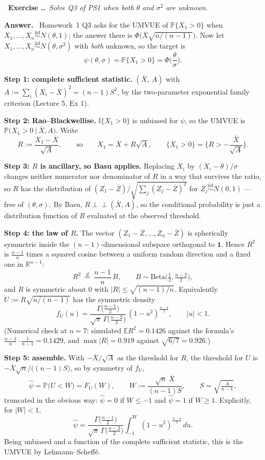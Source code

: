 \documentclass[11pt]{article}
\newcommand{\E}{\mathbb{E}}
\newcommand{\Prob}{\mathbb{P}}
\newcommand{\R}{\mathbb{R}}
\newcommand{\Xbar}{\overline{X}}
\newcommand{\Zbar}{\overline{Z}}
\newcommand{\iid}{\overset{\text{iid}}{\sim}}
\newcommand{\ind}{\perp\!\!\!\perp}
\newcommand{\I}{\mathbb{I}}
\newcounter{exc}[section]
\newenvironment{exc}[1]{\medskip\refstepcounter{exc}%
  \noindent\textbf{\color{ForestGreen}\raisebox{0.5pt}{\scriptsize$\blacksquare$}\ Exercise \thesection.\theexc.}\ \textit{#1}\par\nopagebreak}{\par}
\newcommand{\ans}{\smallskip\noindent\textbf{Answer.}\ }
\begin{document}
\begin{exc}{Solve Q3 of PS1 when both $\theta$ and $\sigma^2$ are unknown.}
\end{exc}
\ans
Homework~1 Q3 asks for the UMVUE of $\Prob\{X_1>0\}$ when $X_1,\dots,X_n\iid N(\theta,1)$;
the answer there is $\Phi\big(\Xbar\sqrt{n/(n-1)}\big)$. Now let
$X_1,\dots,X_n\iid N(\theta,\sigma^2)$ with \emph{both} unknown, so the target is
\[
\psi(\theta,\sigma)=\Prob\{X_1>0\}=\Phi\!\Big(\frac{\theta}{\sigma}\Big).
\]

\textbf{Step 1: complete sufficient statistic.} $(\Xbar,\ A)$ with
$A:=\sum_i(X_i-\Xbar)^2=(n-1)S^2$, by the two-parameter exponential family criterion
(Lecture 5, Ex 1).

\textbf{Step 2: Rao--Blackwellise.} $\I\{X_1>0\}$ is unbiased for $\psi$, so the UMVUE is
$\Prob\big(X_1>0\ \big|\ \Xbar,A\big)$. Write
\[
R:=\frac{X_1-\Xbar}{\sqrt{A}},\qquad\text{so}\qquad X_1=\Xbar+R\sqrt A,
\qquad
\{X_1>0\}=\Big\{R>-\frac{\Xbar}{\sqrt A}\Big\}.
\]

\textbf{Step 3: $R$ is ancillary, so Basu applies.} Replacing $X_i$ by $(X_i-\theta)/\sigma$
changes neither numerator nor denominator of $R$ in a way that survives the ratio, so $R$ has
the distribution of $(Z_1-\Zbar)/\sqrt{\sum_j(Z_j-\Zbar)^2}$ for $Z_j\iid N(0,1)$ --- free of
$(\theta,\sigma)$. By Basu, $R\ind(\Xbar,A)$, so the conditional probability is just a
distribution function of $R$ evaluated at the observed threshold.

\textbf{Step 4: the law of $R$.} The vector $(Z_1-\Zbar,\dots,Z_n-\Zbar)$ is spherically
symmetric inside the $(n-1)$-dimensional subspace orthogonal to $\mathbf 1$. Hence
$R^2$ is $\tfrac{n-1}{n}$ times a squared cosine between a uniform random direction and a
fixed one in $\R^{n-1}$:
\[
R^{2}\ \overset{d}{=}\ \frac{n-1}{n}\,B,\qquad B\sim\mathrm{Beta}\Big(\tfrac12,\tfrac{n-2}{2}\Big),
\]
and $R$ is symmetric about $0$ with $|R|\le\sqrt{(n-1)/n}$. Equivalently
$U:=R\sqrt{n/(n-1)}$ has the symmetric density
\[
f_U(u)=\frac{\Gamma\!\big(\frac{n-1}{2}\big)}{\sqrt\pi\,\Gamma\!\big(\frac{n-2}{2}\big)}
\,(1-u^{2})^{\frac{n-4}{2}},\qquad |u|<1 .
\]
(Numerical check at $n=7$: simulated $\E R^2=0.1426$ against the formula's
$\tfrac{n-1}{n}\cdot\tfrac{1}{n-1}=0.1429$, and $\max|R|=0.919$ against
$\sqrt{6/7}=0.926$.)

\textbf{Step 5: assemble.} With
$-\Xbar/\sqrt A$ as the threshold for $R$, the threshold for $U$ is
$-\Xbar\sqrt{n}/\big((n-1)S\big)$, so by symmetry of $f_U$,
\[
\boxed{\ \widehat\psi=\Prob\big(U<W\big)=F_U(W),\qquad
W:=\frac{\sqrt n\ \Xbar}{(n-1)S},\qquad S=\sqrt{\tfrac{A}{n-1}},\ }
\]
truncated in the obvious way: $\widehat\psi=0$ if $W\le-1$ and $\widehat\psi=1$ if $W\ge1$.
Explicitly, for $|W|<1$,
\[
\widehat\psi
=\frac{\Gamma\!\big(\frac{n-1}{2}\big)}{\sqrt\pi\,\Gamma\!\big(\frac{n-2}{2}\big)}
\int_{-1}^{W}(1-u^{2})^{\frac{n-4}{2}}\,du .
\]
Being unbiased and a function of the complete sufficient statistic, this is the UMVUE by
Lehmann--Scheff\'e.
\end{document}
